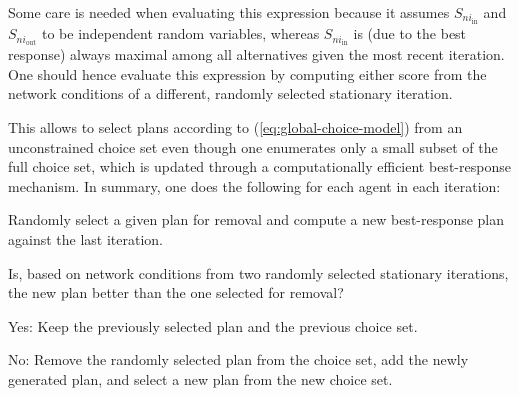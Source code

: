 Some care is needed when evaluating this expression because it assumes
$S_{ni_{\text{in}}}$ and $S_{ni_{\text{out}}}$ to be independent
random variables, whereas $S_{ni_{\text{in}}}$ is (due to the best
response) always maximal among all alternatives given the most recent
iteration. One should hence evaluate this expression by computing
either score from the network conditions of
%
%
a different, randomly selected stationary iteration.
%

This allows to select plans according to (\ref{eq:global-choice-model})
from an unconstrained choice set even though one enumerates only a
small subset of the full choice set, which is updated through a computationally
efficient best-response mechanism.
%
%
%
In summary, one does the following
for each agent in each iteration:
\begin{compactenum}
\item Randomly select a given plan for removal
%
%
%
%
and compute a new best-response plan against the last iteration.
\item Is, based on network conditions from two randomly selected stationary
iterations, the new plan better than the one selected for removal?

\begin{compactitem}
\item Yes: Keep the previously selected plan and the previous choice set.
\item No: Remove the randomly selected plan from the choice set, add the
newly generated plan, and select a new plan from the new choice set.
\end{compactitem}
\end{compactenum}
